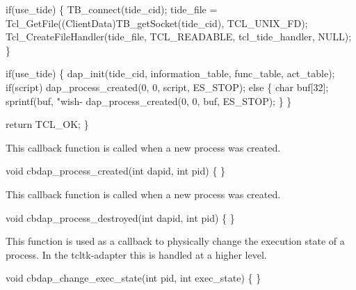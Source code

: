   if(use_tide) \{
    TB_connect(tide_cid);
    tide_file = Tcl_GetFile((ClientData)TB_getSocket(tide_cid), TCL_UNIX_FD);
    Tcl_CreateFileHandler(tide_file, TCL_READABLE, tcl_tide_handler, NULL);
  \}

  if(use_tide) \{
    dap_init(tide_cid, information_table, func_table, act_table);
    if(script)
      dap_process_created(0, 0, script, ES_STOP);
    else \{
      char buf[32];
      sprintf(buf, "wish-%
      dap_process_created(0, 0, buf, ES_STOP);
    \}
  \}

  return TCL_OK;
\}
\nwendcode{}\nwdocspar



This callback function is called when a new process was created.

\nwenddocs{}\endmoddef\let\nwnotused=\nwoutput{}
void cbdap_process_created(int dapid, int pid)
\{
\}
\nwendcode{}\nwdocspar


This callback function is called when a new process was created.

\nwenddocs{}\endmoddef\let\nwnotused=\nwoutput{}
void cbdap_process_destroyed(int dapid, int pid)
\{
\}
\nwendcode{}\nwdocspar


This function is used as a callback to physically change
the execution state of a process.
In the tcltk-adapter this is handled at a higher level.

\nwenddocs{}\endmoddef\let\nwnotused=\nwoutput{}
void cbdap_change_exec_state(int pid, int exec_state)
\{
\}
\nwendcode{}\nwdocspar

